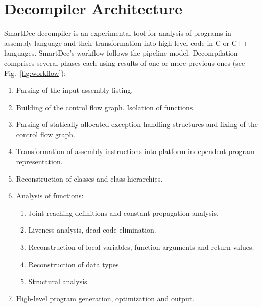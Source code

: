 \documentclass[10pt, conference, compsocconf]{IEEEtran}
\newcommand{\compact}{}
\newcommand{\skipspace}{}
\newcommand{\skipsectionspace}{}
\begin{document}
\section{Decompiler Architecture}\label{sectionArchitecture}\skipsectionspace
SmartDec decompiler is an experimental tool for analysis of programs
in assembly language and their transformation into high-level code
in C or C++ languages.
SmartDec's workflow follows the pipeline model. 
Decompilation comprises several phases each using results of one 
or more previous ones (see Fig.~\ref{fig:workflow}):

\skipspace\begin{enumerate}\compact
\item Parsing of the input assembly listing.
\item Building of the control flow graph. Isolation of functions.
\item Parsing of statically allocated exception handling structures and fixing of the control flow graph.
\item Transformation of assembly instructions into platform-independent program representation.
\item Reconstruction of classes and class hierarchies.
\item Analysis of functions:
\skipspace\begin{enumerate}\compact
  \item Joint reaching definitions and constant propagation analysis.
  \item Liveness analysis, dead code elimination.
  \item Reconstruction of local variables, function arguments and return values.
  \item Reconstruction of data types.
  \item Structural analysis.
\end{enumerate}
\item High-level program generation, optimization and output.
\end{enumerate}
\end{document}
